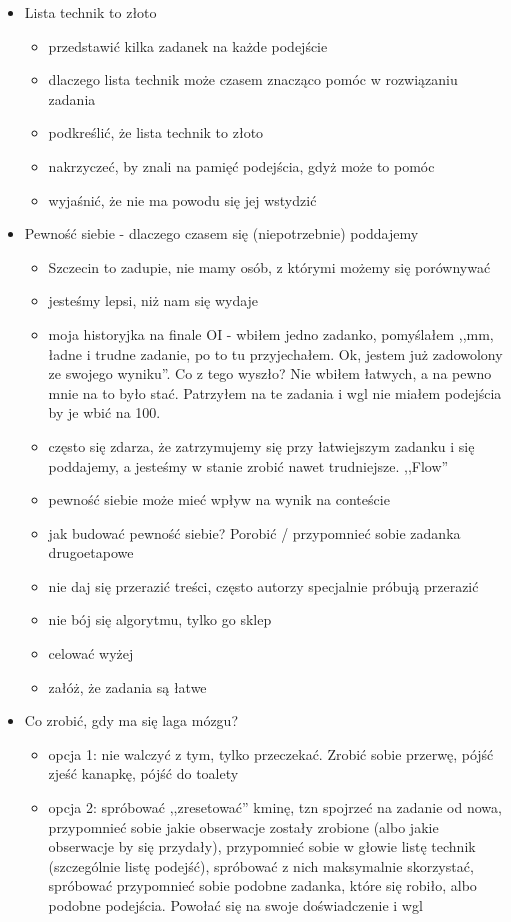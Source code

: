 \documentclass{article}
\begin{document}
\begin{itemize}
    \item Lista technik to złoto
    \begin{itemize}
        \item przedstawić kilka zadanek na każde podejście
        \item dlaczego lista technik może czasem znacząco pomóc w rozwiązaniu zadania
        \item podkreślić, że lista technik to złoto
        \item nakrzyczeć, by znali na pamięć podejścia, gdyż może to pomóc
        \item wyjaśnić, że nie ma powodu się jej wstydzić
    \end{itemize}
    
    \item Pewność siebie - dlaczego czasem się (niepotrzebnie) poddajemy
    \begin{itemize}
        \item Szczecin to zadupie, nie mamy osób, z którymi możemy się porównywać
        \item jesteśmy lepsi, niż nam się wydaje
        \item moja historyjka na finale OI - wbiłem jedno zadanko, pomyślałem ,,mm, ładne i trudne zadanie, po to tu przyjechałem. Ok, jestem już zadowolony ze swojego wyniku''. Co z tego wyszło? Nie wbiłem łatwych, a na pewno mnie na to było stać. Patrzyłem na te zadania i wgl nie miałem podejścia by je wbić na 100.
        \item często się zdarza, że zatrzymujemy się przy łatwiejszym zadanku i się poddajemy, a jesteśmy w stanie zrobić nawet trudniejsze. ,,Flow''
        \item pewność siebie może mieć wpływ na wynik na conteście
        \item jak budować pewność siebie? Porobić / przypomnieć sobie zadanka drugoetapowe
        \item nie daj się przerazić treści, często autorzy specjalnie próbują przerazić
        \item nie bój się algorytmu, tylko go sklep
        \item celować wyżej
        \item załóż, że zadania są łatwe
    \end{itemize}
    
    \item Co zrobić, gdy ma się laga mózgu?
    \begin{itemize}
        \item opcja 1: nie walczyć z tym, tylko przeczekać. Zrobić sobie przerwę, pójść zjeść kanapkę, pójść do toalety
        \item opcja 2: spróbować ,,zresetować'' kminę, tzn spojrzeć na zadanie od nowa, przypomnieć sobie jakie obserwacje zostały zrobione (albo jakie obserwacje by się przydały), przypomnieć sobie w głowie listę technik (szczególnie listę podejść), spróbować z nich maksymalnie skorzystać, spróbować przypomnieć sobie podobne zadanka, które się robiło, albo podobne podejścia. Powołać się na swoje doświadczenie i wgl
    \end{itemize}
    

\end{itemize}
\end{document}
